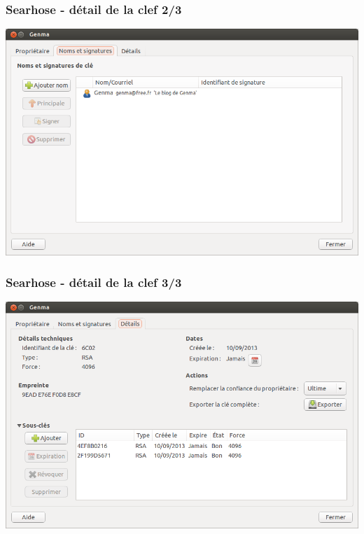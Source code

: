 \documentclass{beamer}
\begin{document}
\begin{frame}
\frametitle{Searhose - détail de la clef 2/3}
\begin{center}
\includegraphics[scale=0.3] {./images/Seahorse08_creationclef.png}
\end{center}
\end{frame}

\begin{frame}
\frametitle{Searhose - détail de la clef 3/3}
\begin{center}
\includegraphics[scale=0.3] {./images/Seahorse09_creationclef.png}
\end{center}
\end{frame}
\end{document}

